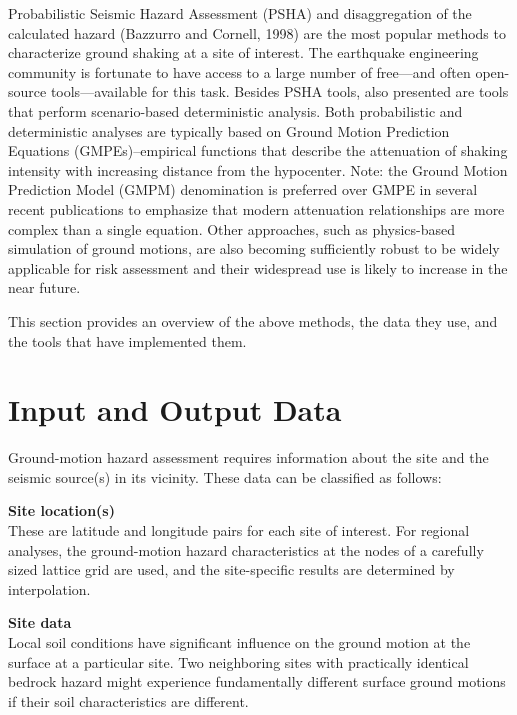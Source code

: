 Probabilistic Seismic Hazard Assessment (PSHA) and disaggregation of the calculated hazard (Bazzurro and Cornell, 1998) are the most popular methods to characterize ground shaking at a site of interest. The earthquake engineering community is fortunate to have access to a large number of free—and often open-source tools—available for this task. Besides PSHA tools, also presented are tools that perform scenario-based deterministic analysis. Both probabilistic and deterministic analyses are typically based on Ground Motion Prediction Equations (GMPEs)–empirical functions that describe the attenuation of shaking intensity with increasing distance from the hypocenter. Note: the Ground Motion Prediction Model (GMPM) denomination is preferred over GMPE in several recent publications to emphasize that modern attenuation relationships are more complex than a single equation. Other approaches, such as physics-based simulation of ground motions, are also becoming sufficiently robust to be widely applicable for risk assessment and their widespread use is likely to increase in the near future. 

This section provides an overview of the above methods, the data they use, and the tools that have implemented them.

\section{Input and Output Data}
\label{sec:eq_shake_io}

Ground-motion hazard assessment requires information about the site and the seismic source(s) in its vicinity. These data can be classified as follows:
\newline

\noindent\textbf{Site location(s)} \\These are latitude and longitude pairs for each site of interest. For regional analyses, the ground-motion hazard characteristics at the nodes of a carefully sized lattice grid are used, and the site-specific results are determined by interpolation.
\newline

\noindent\textbf{Site data} \\Local soil conditions have significant influence on the ground motion at the surface at a particular site. Two neighboring sites with practically identical bedrock hazard might experience fundamentally different surface ground motions if their soil characteristics are different. 

